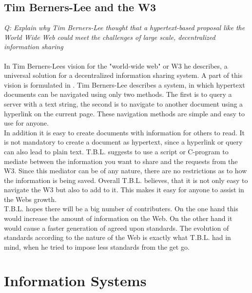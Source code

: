 \documentclass{sig-alternate-05-2015}
\begin{document}
\subsection{Tim Berners-Lee and the W3}
{\it Q: Explain why Tim Berners-Lee thought that a hypertext-based proposal like the World Wide Web could meet the challenges of large scale, decentralized information sharing} \\\\
In Tim Berners-Lees vision for the "world-wide web" or W3 he describes, a universal solution for a decentralized information sharing system. A part of this vision is formulated in \cite{timbw3}. Tim Berners-Lee describes a system, in which hypertext documents can be navigated using only two methods. The first is to query a server with a text string, the second is to navigate to another document using a hyperlink on the current page. These navigation methods are simple and easy to use for anyone.\\
In addition it is easy to create documents with information for others to read. It is not mandatory to create a document as hypertext, since a hyperlink or query can also lead to plain text. T.B.L. suggests to use a script or C-program to mediate between the information you want to share and the requests from the W3. Since this mediator can be of any nature, there are no restrictions as to how the information is being saved. Overall T.B.L. believes, that it is not only easy to navigate the W3 but also to add to it. This makes it easy for anyone to assist in the Webs growth. \\
T.B.L. hopes there will be a big number of contributers. On the one hand this would increase the amount of information on the Web. On the other hand it would cause a faster generation of agreed upon standards. The evolution of standards according to the nature of the Web is exactly what T.B.L. had in mind, when he tried to impose less standards from the get go.\\


\section{Information Systems}
\end{document}
